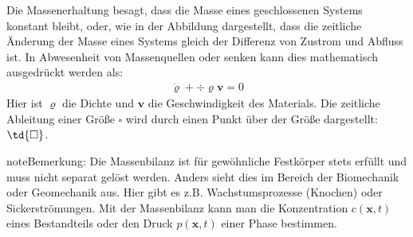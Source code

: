 \documentclass[letterpaper,10pt,german]{jupyterBook}
\begin{document}
\sphinxAtStartPar
Die Massenerhaltung besagt, dass die Masse eines geschlossenen Systems konstant bleibt, oder, wie in der Abbildung dargestellt, dass die zeitliche Änderung der Masse eines Systems gleich der Differenz von Zustrom und Abfluss ist. In Abwesenheit von Massenquellen oder \sphinxhyphen{}senken kann dies mathematisch ausgedrückt werden als:
\begin{equation}\label{equation:chapters/chapter1/elasticity:Massenbilanz}
\begin{split}\dot{\varrho} +  \div{\varrho {\bm{v}}} = 0\end{split}
\end{equation}
\sphinxAtStartPar
Hier ist \(\varrho\) die Dichte und \(\bm{v}\) die Geschwindigkeit des Materials. Die zeitliche Ableitung einer Größe \(\square\) wird durch einen Punkt über der Größe dargestellt: \(\td{\square}\).

\begin{sphinxadmonition}{note}{Bemerkung:}
\sphinxAtStartPar
Die Massenbilanz ist für gewöhnliche Festkörper stets erfüllt und muss nicht separat gelöst werden. Anders sieht dies im Bereich der Biomechanik oder Geomechanik aus. Hier gibt es z.B. Wachstumsprozesse (Knochen) oder Sickerströmungen. Mit der Massenbilanz kann man die Konzentration \(c(\bm{x},t)\) eines Bestandteils oder den Druck \(p(\bm{x},t)\) einer Phase bestimmen.
\end{sphinxadmonition}
\end{document}
